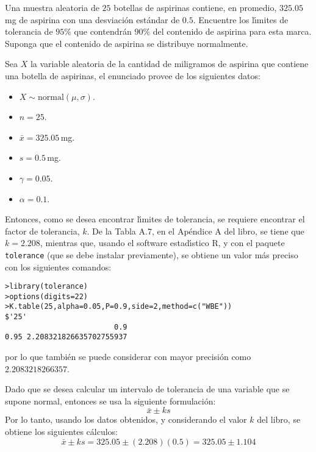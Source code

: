 \begin{enunciado}
 Una muestra aleatoria de $25$ botellas de aspirinas contiene, en promedio, $325.05\,$mg de aspirina con una desviaci\'on est\'andar de $0.5$. Encuentre los l\'{\i}mites de tolerancia de $95\%$ que contendr\'an $90\%$ del contenido de aspirina para esta marca. Suponga que el contenido de aspirina se distribuye normalmente.
\end{enunciado}

\begin{solucion}
 Sea $X$ la variable aleatoria de la cantidad de miligramos de aspirina que contiene una botella de aspirinas, el enunciado provee de los siguientes datos:
 \begin{itemize}
  \item $X\sim\text{normal}(\mu,\sigma)$.
  \item $n=25$.
  \item $\bar{x} = 325.05\,$mg.
  \item $s=0.5\,$mg.
  \item $\gamma=0.05$.
  \item $\alpha=0.1$.
 \end{itemize}
 Entonces, como se desea encontrar l\'{\i}mites de tolerancia, se requiere encontrar el factor de tolerancia, $k$. De la Tabla A.7, en el Ap\'endice A del libro, se tiene que $k = 2.208$, mientras que, usando el software estad\'{\i}stico R, y con el paquete \texttt{tolerance} (que se debe instalar previamente), se obtiene un valor m\'as preciso con los siguientes comandos:
 \begin{verbatim}
>library(tolerance)
>options(digits=22)
>K.table(25,alpha=0.05,P=0.9,side=2,method=c("WBE"))
$'25'
                         0.9
0.95 2.208321826635702755937
 \end{verbatim}
 \vspace{-0.5cm}
 por lo que tambi\'en se puede considerar con mayor precisi\'on como $2.2083218266357$.
 \par
 Dado que se desea calcular un intervalo de tolerancia de una variable que se supone normal, entonces se usa la siguiente formulaci\'on:
 \begin{equation*}
  \bar{x}\pm ks
 \end{equation*}
 Por lo tanto, usando los datos obtenidos, y considerando el valor $k$ del libro, se obtiene los siguientes c\'alculos:
 \begin{equation*}
  \bar{x}\pm ks = 325.05\pm (2.208)(0.5) = 325.05 \pm 1.104
 \end{equation*}

\end{solucion}
